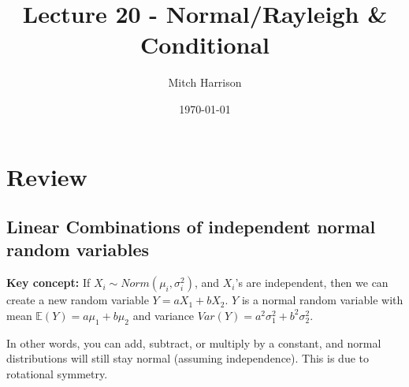 \documentclass[titlepage, 12pt, leqno]{article}
\title{\Huge{Lecture 20 - Normal/Rayleigh \& Conditional}}
\author{\large{Mitch Harrison}}
\date{\today}
\begin{document}
\setlength{\parskip}{1\baselineskip}
\setlength{\parindent}{15pt}
\maketitle
\tableofcontents
\newpage


\section{Review}

\subsection{Linear Combinations of independent normal random variables}
\textbf{Key concept:} If $X_i \sim Norm(\mu_i, \sigma_i^2)$, and $X_i$'s are independent,
then we can create a new random variable $Y = aX_1 + bX_2$. $Y$ is a normal random 
variable with mean $ \mathbb{E}(Y) = a\mu_1 + b\mu_2$ and variance $Var(Y) = a^2\sigma_1^2
+ b^2\sigma_2^2$.

In other words, you can add, subtract, or multiply by a constant, and normal distributions
will still stay normal (assuming independence). This is due to rotational symmetry.
\end{document}
